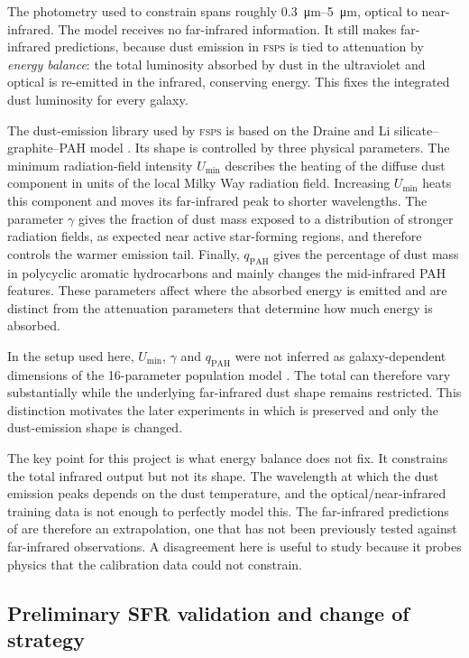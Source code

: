 \documentclass[12pt,a4paper]{article}
\begin{document}
The photometry used to constrain \popcosmos{} spans roughly \SIrange{0.3}{5}{\um},
optical to near-infrared. The model receives no far-infrared information. It still makes
far-infrared predictions, because dust emission in \textsc{fsps} is tied to attenuation
by \emph{energy balance}: the total luminosity absorbed by dust in the ultraviolet and
optical is re-emitted in the infrared, conserving energy. This fixes the integrated dust
luminosity \LIR{} for every galaxy.

The dust-emission library used by \textsc{fsps} is based on the Draine and Li
silicate--graphite--PAH model \citep{Draine_2007}. Its shape is controlled by three
physical parameters. The minimum radiation-field intensity $U_{\min}$ describes the
heating of the diffuse dust component in units of the local Milky Way radiation field.
Increasing $U_{\min}$ heats this component and moves its far-infrared peak to shorter
wavelengths. The parameter $\gamma$ gives the fraction of dust mass exposed to a
distribution of stronger radiation fields, as expected near active star-forming
regions, and therefore controls the warmer emission tail. Finally,
$q_{\mathrm{PAH}}$ gives the percentage of dust mass in polycyclic aromatic
hydrocarbons and mainly changes the mid-infrared PAH features. These parameters affect
where the absorbed energy is emitted and are distinct from the attenuation parameters
that determine how much energy is absorbed.

In the \popcosmos{} setup used here, $U_{\min}$, $\gamma$ and $q_{\mathrm{PAH}}$
were not inferred as galaxy-dependent dimensions of the 16-parameter population model
\citep{Alsing_2024,Thorp_2025_insights}.
The total \LIR{} can therefore vary substantially while the underlying far-infrared
dust shape remains restricted. This distinction motivates the later experiments in
which \LIR{} is preserved and only the dust-emission shape is changed.

The key point for this project is what energy balance does not fix. It constrains
the total infrared output but not its shape. The wavelength at which the dust emission
peaks depends on the dust temperature, and the optical/near-infrared training
data is not enough to perfectly model this. The far-infrared predictions of \popcosmos{} are therefore an
extrapolation, one that has not been previously tested against far-infrared observations.
A disagreement here
is useful to study because it probes physics that the calibration data could not
constrain.

\subsection{Preliminary SFR validation and change of strategy}
\label{sec:intro:sfr-pivot}
\end{document}
